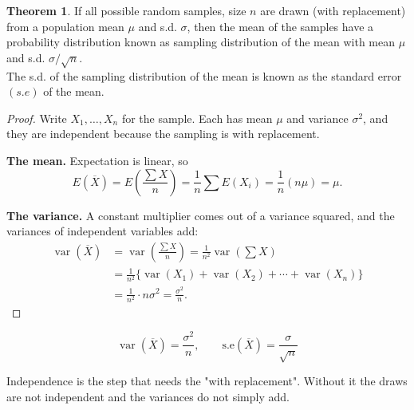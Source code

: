\documentclass[11pt,a4paper]{article}
\theoremstyle{definition}
\newtheorem{thm}{Theorem}[section]
\begin{document}
\begin{thm}
If all possible random samples, size $n$ are drawn (with replacement) from a population mean $\mu$ and s.d. $\sigma$, then the mean of the samples  have a probability distribution known as sampling distribution of the mean with mean $\mu$ and s.d. $\sigma /\sqrt{n}$.\\ The s.d. of the sampling distribution of the mean is known as the standard error $(s.e)$ of the mean.\\[1ex]
\end{thm}





\pagebreak

\begin{proof}
Write $X_1,\ldots,X_n$ for the sample. Each has mean $\mu$ and variance $\sigma^2$, and they
are independent because the sampling is with replacement.

\textbf{The mean.} Expectation is linear, so
\[E(\overline{X})=E\!\left(\frac{\sum X}{n}\right)=\frac{1}{n}\sum E(X_i)=\frac{1}{n}(n\mu)=\mu.\]

\textbf{The variance.} A constant multiplier comes out of a variance squared, and the
variances of independent variables add:
\begin{align*}
\operatorname{var}(\overline{X})
 &=\operatorname{var}\!\left(\frac{\sum X}{n}\right)=\frac{1}{n^2}\operatorname{var}\!\left(\sum X\right)\\
 &=\frac{1}{n^2}\{\operatorname{var}(X_1)+\operatorname{var}(X_2)+\cdots+\operatorname{var}(X_n)\}\\
 &=\frac{1}{n^2}\cdot n\sigma^2=\frac{\sigma^2}{n}.
\end{align*}
\end{proof}

\begin{equation}\label{eq:var-xbar}
\operatorname{var}(\overline{X})=\frac{\sigma^2}{n},\qquad
\text{s.e}(\overline{X})=\frac{\sigma}{\sqrt{n}}
\end{equation}

Independence is the step that needs the "with replacement". Without it the draws are not
independent and the variances do not simply add.
\end{document}

